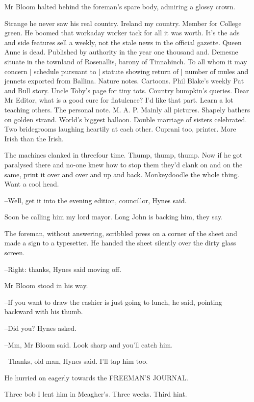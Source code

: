 
Mr Bloom halted behind the foreman's spare body,
admiring a glossy crown.

Strange he never saw his real country.
Ireland my country.
Member for College green.
He boomed that workaday worker tack for all it was worth.
It's the ads and side features sell a weekly,
not the stale news in the official gazette.
Queen Anne is dead.
Published by authority in the year one thousand and.
Demesne situate in the townland of Rosenallis,
barony of Tinnahinch.
To all whom it may concern |
schedule pursuant to |
statute showing return of |
number of mules and jennets exported from Ballina.
Nature notes.
Cartoons.
Phil Blake's weekly Pat and Bull story.
Uncle Toby's page for tiny tots.
Country bumpkin's queries.
Dear Mr Editor, what is a good cure for flatulence?
I'd like that part.
Learn a lot teaching others.
The personal note.
M. A. P. Mainly all pictures.
Shapely bathers on golden strand.
World's biggest balloon.
Double marriage of sisters celebrated.
Two bridegrooms laughing heartily at each other.
Cuprani too, printer.
More Irish than the Irish.

The machines clanked in threefour time.
Thump, thump, thump.
Now if he got paralysed there
and no-one knew how to stop them
they'd clank on and on the same,
print it over and over and up and back.
Monkeydoodle the whole thing.
Want a cool head.

--Well, get it into the evening edition, councillor,
Hynes said.

Soon be calling him my lord mayor.
Long John is backing him, they say.

The foreman, without answering,
scribbled press on a corner of the sheet
and made a sign to a typesetter.
He handed the sheet silently over the dirty glass screen.

--Right: thanks,
Hynes said moving off.

Mr Bloom stood in his way.

--If you want to draw the cashier is just going to lunch,
he said,
pointing backward with his thumb.

--Did you?
Hynes asked.

--Mm,
Mr Bloom said.
Look sharp and you'll catch him.

--Thanks, old man,
Hynes said.
I'll tap him too.

He hurried on eagerly towards the FREEMAN'S JOURNAL.

Three bob I lent him in Meagher's.
Three weeks.
Third hint.


